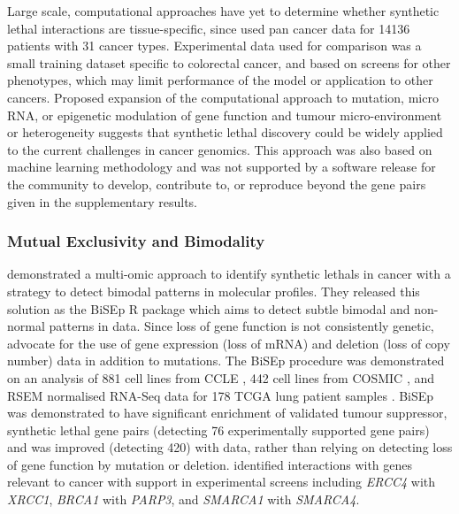 Large scale, computational approaches have yet to determine whether \gls{synthetic lethal} interactions are tissue-specific, since \citet{Lu2015} used \gls{pan cancer} data for 14136 patients with 31 cancer types. Experimental data used for comparison was a small training dataset specific to colorectal cancer, and based on screens for other phenotypes, which may limit performance of the model or application to other cancers. Proposed expansion of the computational approach to \gls{mutation}, micro RNA, or epigenetic modulation of gene function and tumour micro-environment or heterogeneity suggests that \gls{synthetic lethal} discovery could be widely applied to the current challenges in cancer \glspl{genomic}. This approach was also based on machine learning methodology and was not supported by a software release for the community to develop, contribute to, or reproduce beyond the gene pairs given in the supplementary results. 

\subsubsection{Mutual Exclusivity and Bimodality}

\citet{Wappett2016} demonstrated a multi-omic approach to identify \glspl{synthetic lethal} in cancer with a strategy to detect bimodal patterns in \glspl{molecular profile}. They released this solution as the \gls{BiSEp} R package \citep{Wappett2014} which aims to detect subtle bimodal and non-normal patterns in  data. Since loss of gene function is not consistently genetic, \citet{Wappett2016} advocate for the use of \gls{gene expression} (loss of \acrshort{mRNA}) and deletion (loss of copy number) data in addition to \glspl{mutation}. The \gls{BiSEp} procedure was demonstrated on an analysis of 881 cell lines from CCLE \citep{Barretina2012}, 442 cell lines from COSMIC \citep{Forbes2015}, and \gls{RSEM} normalised \gls{RNA-Seq} data for 178 \gls{TCGA} lung patient samples \citep{TCGA2014LU}. \gls{BiSEp} was demonstrated to have significant enrichment of validated \gls{tumour suppressor}, \gls{synthetic lethal} gene pairs (detecting 76 experimentally supported gene pairs) and was improved (detecting 420) with  data, rather than relying on detecting loss of gene function by \gls{mutation} or deletion. \citet{Wappett2016} identified interactions with genes relevant to cancer with support in experimental screens including \textit{ERCC4} with \textit{XRCC1}, \textit{BRCA1} with \textit{PARP3}, and \textit{SMARCA1} with \textit{SMARCA4}.

